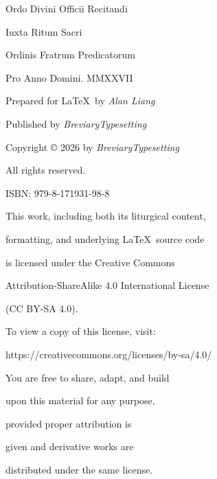 \documentclass[openany]{book}
\renewcommand{\\}{\par\hspace*{.25em}} %
\renewcommand{\newline}{\par}
\begin{document}
\vspace{+7em}
\begin{center}
\large
Ordo Divini Officii Recitandi
\newline Iuxta Ritum Sacri
\newline Ordinis Fratrum Predicatorum
\newline Pro Anno Domini. MMXXVII
\end{center}
\begin{center}

\end{center}
\begin{center}

\newline Prepared for \LaTeX \ by \emph{Alan Liang}
\end{center}
\begin{center}

\newline Published by \emph{BreviaryTypesetting}
\end{center}
\begin{center}

\newline Copyright © 2026 by \emph{BreviaryTypesetting}
\newline All rights reserved.
\end{center}
\begin{center}


\newline ISBN: 979-8-171931-98-8
\end{center}
\begin{center}


This work, including both its liturgical content,
\newline formatting, and underlying \LaTeX \ source code
\newline is licensed under the Creative Commons
\newline Attribution-ShareAlike 4.0 International License
\newline (CC BY-SA 4.0).
\end{center}
\begin{center}

\newline To view a copy of this license, visit:
\newline https://creativecommons.org/licenses/by-sa/4.0/
\end{center}
\begin{center}

You are free to share, adapt, and build
\newline upon this material for any purpose,
\newline provided proper attribution is
\newline given and derivative works are
\newline distributed under the same license.
\end{center}
\end{document}
